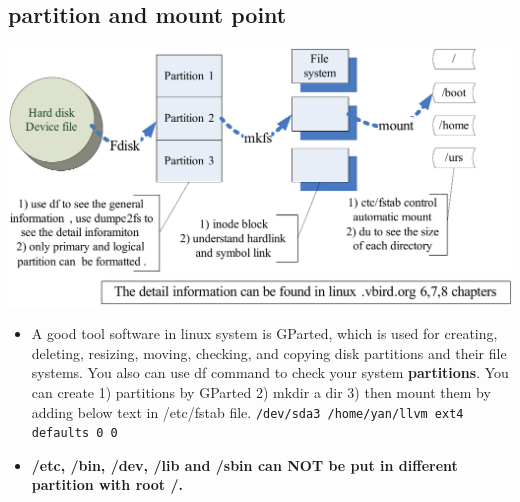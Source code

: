 \documentclass[a4paper,12pt,twoside]{book}
\begin{document}
\subsection{partition and mount point}
	\includegraphics[scale=0.8]{pics/basic_file_system_clip}
\begin{itemize} 
		\item A good tool software in linux system is GParted, which  is used for creating, deleting, resizing, moving, checking, and copying disk partitions and their file systems.  You also can use df command to check your system \textbf{partitions}. You can create 1) partitions by GParted 2) mkdir a dir 3) then mount them by adding below text in /etc/fstab file. \verb=/dev/sda3 /home/yan/llvm ext4 defaults 0 0=
   
		\item \textbf{/etc, /bin, /dev, /lib and /sbin can NOT be put in different partition with root /. }  
\end{itemize}
\end{document}
